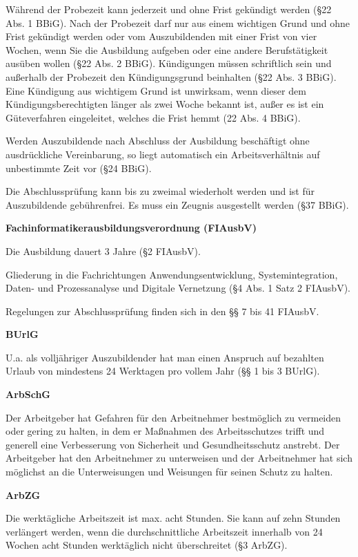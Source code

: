 Während der Probezeit kann jederzeit und ohne Frist gekündigt werden (§22 Abs. 1 BBiG). Nach der Probezeit darf nur aus einem wichtigen Grund und ohne Frist gekündigt werden oder vom Auszubildenden mit einer Frist von vier Wochen, wenn Sie die Ausbildung aufgeben oder eine andere Berufstätigkeit ausüben wollen (§22 Abs. 2 BBiG). Kündigungen müssen schriftlich sein und außerhalb der Probezeit den Kündigungsgrund beinhalten (§22 Abs. 3 BBiG). Eine Kündigung aus wichtigem Grund ist unwirksam, wenn dieser dem Kündigungsberechtigten länger als zwei Woche bekannt ist, außer es ist ein Güteverfahren eingeleitet, welches die Frist hemmt (22 Abs. 4 BBiG).

Werden Auszubildende nach Abschluss der Ausbildung beschäftigt ohne ausdrückliche Vereinbarung, so liegt automatisch ein Arbeitsverhältnis auf unbestimmte Zeit vor (§24 BBiG).

Die Abschlussprüfung kann bis zu zweimal wiederholt werden und ist für Auszubildende gebührenfrei. Es muss ein Zeugnis ausgestellt werden (§37 BBiG).

\textbf{Fachinformatikerausbildungsverordnung (FIAusbV)}

Die Ausbildung dauert 3 Jahre (§2 FIAusbV).

Gliederung in die Fachrichtungen Anwendungsentwicklung, Systemintegration, Daten- und Prozessanalyse und Digitale Vernetzung (§4 Abs. 1 Satz 2 FIAusbV).

Regelungen zur Abschlussprüfung finden sich in den §§ 7 bis 41 FIAusbV.

\textbf{BUrlG}

U.a. als volljähriger Auszubildender hat man einen Anspruch auf bezahlten Urlaub von mindestens 24 Werktagen pro vollem Jahr (§§ 1 bis 3 BUrlG).

\textbf{ArbSchG}

Der Arbeitgeber hat Gefahren für den Arbeitnehmer bestmöglich zu vermeiden oder gering zu halten, in dem er Maßnahmen des Arbeitsschutzes trifft und generell eine Verbesserung von Sicherheit und Gesundheitsschutz anstrebt. Der Arbeitgeber hat den Arbeitnehmer zu unterweisen und der Arbeitnehmer hat sich möglichst an die Unterweisungen und Weisungen für seinen Schutz zu halten.

\textbf{ArbZG}

Die werktägliche Arbeitszeit ist max. acht Stunden. Sie kann auf zehn Stunden verlängert werden, wenn die durchschnittliche Arbeitszeit innerhalb von 24 Wochen acht Stunden werktäglich nicht überschreitet (§3 ArbZG).

